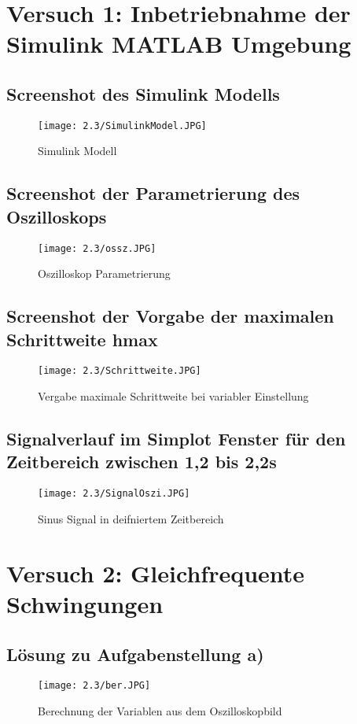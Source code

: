 \documentclass[12pt,a4paper]{scrartcl}	%
\begin{document}
\section{Versuch 1: Inbetriebnahme der Simulink MATLAB Umgebung}
\subsection{Screenshot des Simulink Modells}
\begin{figure}[h!]
	\centering
	\texttt{[image: 2.3/SimulinkModel.JPG]}
	\caption[Simulink Modell]{Simulink Modell} 
\end{figure}
\clearpage
\subsection{Screenshot der Parametrierung des Oszilloskops}
\begin{figure}[h!]
	\centering
	\texttt{[image: 2.3/ossz.JPG]}
	\caption[Oszilloskop Parametrierung]{Oszilloskop Parametrierung} 
\end{figure}
\subsection{Screenshot der Vorgabe der maximalen Schrittweite hmax}
\begin{figure}[h!]
	\centering
	\texttt{[image: 2.3/Schrittweite.JPG]}
	\caption[Vergabe maximale Schrittweite bei variabler Einstellung]{Vergabe maximale Schrittweite bei variabler Einstellung} 
\end{figure}
\subsection{Signalverlauf im Simplot Fenster für den Zeitbereich zwischen 1,2 bis 2,2s}
\begin{figure}[h!]
	\centering
	\texttt{[image: 2.3/SignalOszi.JPG]}
	\caption[Sinus Signal in definiertem Zeitbereich]{Sinus Signal in deifniertem Zeitbereich} 
\end{figure}
\section{Versuch 2: Gleichfrequente Schwingungen}
\subsection{Lösung zu  Aufgabenstellung a)\grqq}
\begin{figure}[ht]
	\centering
	\texttt{[image: 2.3/ber.JPG]}
	\caption[Berechnung der Variablen aus dem Oszilloskopbild]{Berechnung der Variablen aus dem Oszilloskopbild} 
\end{figure}
\clearpage
\end{document}
